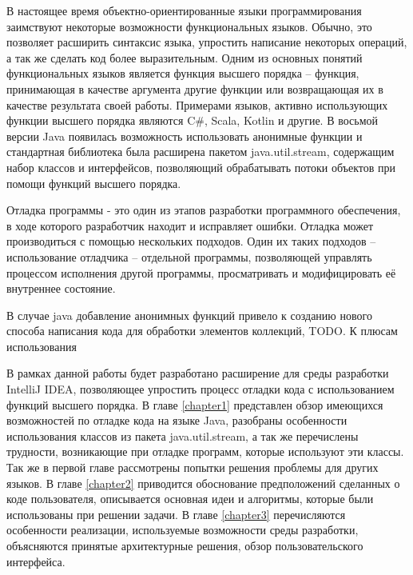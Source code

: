 В настоящее время объектно-ориентированные языки программирования заимствуют некоторые возможности функциональных языков.  Обычно, это позволяет расширить синтаксис языка, упростить написание некоторых операций, а так же сделать код более выразительным. Одним из основных понятий функциональных языков является функция высшего порядка -- функция, принимающая в качестве аргумента другие функции или возвращающая их в качестве результата своей работы. Примерами языков, активно использующих функции высшего порядка являются C\#, Scala, Kotlin и другие. В восьмой версии Java появилась возможность использовать анонимные функции и стандартная библиотека была расширена пакетом java.util.stream, содержащим набор классов и интерфейсов, позволяющий обрабатывать потоки объектов при помощи функций высшего порядка.

Отладка программы - это один из этапов разработки программного обеспечения, в ходе которого разработчик находит и исправляет ошибки. Отладка может производиться с помощью нескольких подходов. Один их таких подходов -- использование отладчика -- отдельной программы, позволяющей управлять процессом исполнения другой программы, просматривать и модифицировать её внутреннее состояние.

В случае java добавление анонимных функций привело к созданию нового способа написания кода для обработки элементов коллекций, TODO. К плюсам использования 

В рамках данной работы будет разработано расширение для среды разработки IntelliJ IDEA, позволяющее упростить процесс отладки кода с использованием функций высшего порядка. В главе \ref{chapter1} представлен обзор имеющихся возможностей по отладке кода на языке Java, разобраны особенности использования классов из пакета java.util.stream, а так же перечислены трудности, возникающие при отладке программ, которые используют эти классы. Так же в первой главе рассмотрены попытки решения проблемы для других языков. В главе \ref{chapter2} приводится обоснование предположений сделанных о коде пользователя, описывается основная идеи и алгоритмы, которые были использованы при решении задачи. В главе \ref{chapter3} перечисляются особенности реализации, используемые возможности среды разработки, объясняются принятые архитектурные решения, обзор пользовательского интерфейса.

